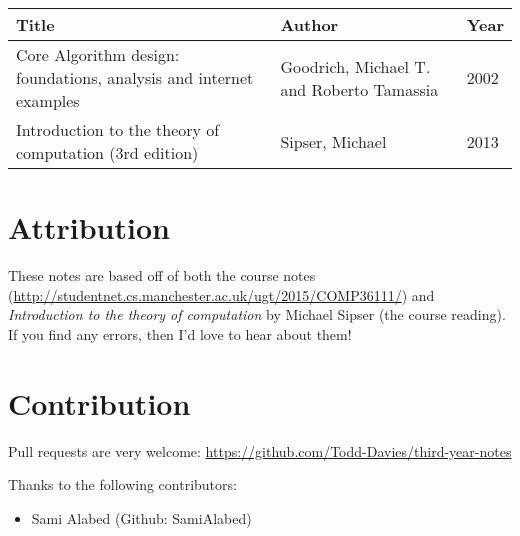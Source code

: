 \begin{tabularx}{\textwidth} {|X|X|l|}
  \hline
  
  Title & Author & Year\\ \hline
    Core Algorithm design: foundations, analysis and internet examples &
    Goodrich, Michael T. and Roberto Tamassia &
    2002 \\ \hline
    Introduction to the theory of computation (3rd edition) &
    Sipser, Michael&
    2013\\ \hline
\end{tabularx}

\section*{Attribution}

These notes are based off of both the course notes
(\url{http://studentnet.cs.manchester.ac.uk/ugt/2015/COMP36111/}) and
\textit{Introduction to the theory of computation} by Michael Sipser (the course
reading). If you find any errors, then I'd love to hear about them!

\section*{Contribution}

Pull requests are very welcome:
\url{https://github.com/Todd-Davies/third-year-notes}

Thanks to the following contributors:
\begin{itemize}
\item{Sami Alabed (Github: SamiAlabed)}
\end{itemize}